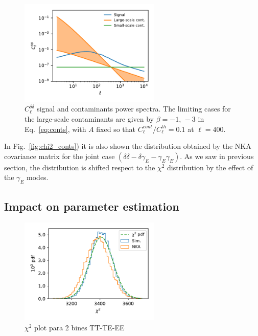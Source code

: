 \documentclass[a4paper,11pt]{article}
\newcommand{\clth}{C_\ell^{th}}
\newcommand{\clc}{C_\ell^{cont}}
\newcommand{\cl}{C_\ell}
\begin{document}
\begin{figure}
  \centering
  \includegraphics[width=0.6\textwidth]{./figures/contaminants_cl.pdf}
  \caption{$\cl^{\delta\delta}$ signal and contaminants power spectra. The
    limiting cases for the large-scale contaminants are given by $\beta=-1,\,
    -3$ in Eq.~\ref{eq:conts}, with $A$ fixed so that $\clc/\clth = 0.1$ at $\ell=400$.}
  \label{fig:conts}
\end{figure}

In Fig.~\ref{fig:chi2_conts}) it is also shown the distribution obtained
by the NKA covariance matrix for the joint case
$(\delta\delta-\delta\gamma_E-\gamma_E\gamma_E)$. As we saw in previous
section, the distribution is shifted respect to the $\chi^2$ distribution by
the effect of the $\gamma_E$ modes.


\subsection{Impact on parameter estimation}
\label{S:cosmo}

\begin{figure}[htb]
  \centering
  \includegraphics[width=0.6\textwidth]{./figures/run_sph_2b_same_mask_NKA_TTTEEE_Full_chi2.pdf}
  \caption{$\chi^2$ plot para 2 bines TT-TE-EE}
  \label{fig:chi2_2bins}
\end{figure}
\end{document}
